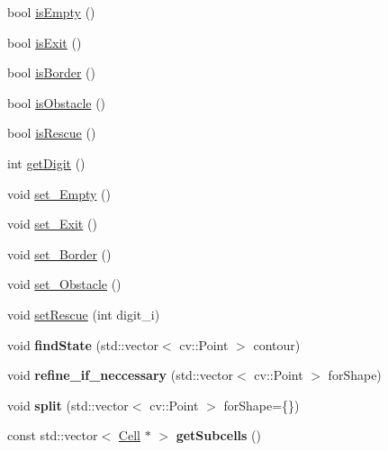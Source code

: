 \begin{DoxyCompactItemize}
\item 
bool \mbox{\hyperlink{class_cell_a6c7344ef2aa917e70364221bf86ff8bc}{is\+Empty}} ()
\item 
bool \mbox{\hyperlink{class_cell_aaf13f5d308c7f1eb670a050e4fc6dc28}{is\+Exit}} ()
\item 
bool \mbox{\hyperlink{class_cell_a34d62b7c65fd85f356bd9e2c3058edcb}{is\+Border}} ()
\item 
bool \mbox{\hyperlink{class_cell_aee32093f779b1fa761b43a6b0a86ed6c}{is\+Obstacle}} ()
\item 
bool \mbox{\hyperlink{class_cell_ad86a719c04ff04bdf79c1c0b8e5a5942}{is\+Rescue}} ()
\item 
int \mbox{\hyperlink{class_cell_a335c410074aaac9bb5594ea8adf648ff}{get\+Digit}} ()
\item 
void \mbox{\hyperlink{class_cell_a8e990447fa7c048d0246ee88640b5060}{set\+\_\+\+Empty}} ()
\item 
void \mbox{\hyperlink{class_cell_a0d8dcfcd6f3f40ce6179cf8fed4694ec}{set\+\_\+\+Exit}} ()
\item 
void \mbox{\hyperlink{class_cell_aaf2c6b0f530432a4a2b47fbbf45c8ba0}{set\+\_\+\+Border}} ()
\item 
void \mbox{\hyperlink{class_cell_af7d43434293cf3df61c07b95af4c3be6}{set\+\_\+\+Obstacle}} ()
\item 
void \mbox{\hyperlink{class_cell_afa194cda3c1e8f9be100c9a14fda7f9d}{set\+Rescue}} (int digit\+\_\+i)
\item 
\mbox{\label{class_cell_a4eb2375f1aaf905bffe8c7c57e3379d4}} 
void {\bfseries find\+State} (std\+::vector$<$ cv\+::\+Point $>$ contour)
\item 
\mbox{\label{class_cell_a4c23ccef6e17cb341ca494933e195eac}} 
void {\bfseries refine\+\_\+if\+\_\+neccessary} (std\+::vector$<$ cv\+::\+Point $>$ for\+Shape)
\item 
\mbox{\label{class_cell_a04ec4b7bd84e8ae7ff1d014a3d9741ed}} 
void {\bfseries split} (std\+::vector$<$ cv\+::\+Point $>$ for\+Shape=\{\})
\item 
\mbox{\label{class_cell_a1e0b427a67335cf9995f0017963f7683}} 
const std\+::vector$<$ \mbox{\hyperlink{class_cell}{Cell}} $\ast$ $>$ {\bfseries get\+Subcells} ()
\item 
\mbox{\label{class_cell_ae076e3a10da38a11957987dbc53050cc}} 

\end{DoxyCompactItemize}
